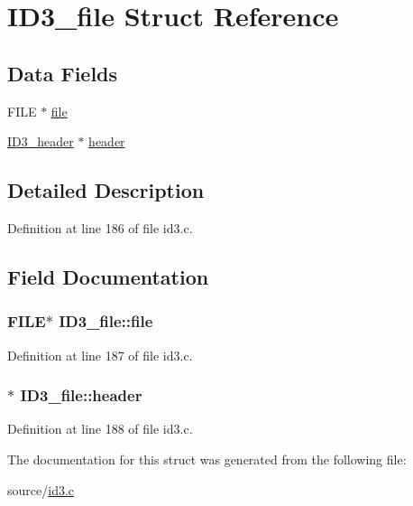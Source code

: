 \hypertarget{structID3__file}{\section{I\-D3\-\_\-file Struct Reference}
\label{structID3__file}
}
\subsection*{Data Fields}
\begin{DoxyCompactItemize}
\item 
F\-I\-L\-E $\ast$ \hyperlink{structID3__file_a2ec35d9c70f5368c51fe6cf5e4ebae28}{file}
\item 
\hyperlink{structID3__header}{I\-D3\-\_\-header} $\ast$ \hyperlink{structID3__file_aeb643841c44545e18ee09451da2bf83d}{header}
\end{DoxyCompactItemize}


\subsection{Detailed Description}


Definition at line 186 of file id3.\-c.



\subsection{Field Documentation}
\hypertarget{structID3__file_a2ec35d9c70f5368c51fe6cf5e4ebae28}{
\subsubsection[{file}]{\setlength{\rightskip}{0pt plus 5cm}F\-I\-L\-E$\ast$ I\-D3\-\_\-file\-::file}}\label{structID3__file_a2ec35d9c70f5368c51fe6cf5e4ebae28}


Definition at line 187 of file id3.\-c.

\hypertarget{structID3__file_aeb643841c44545e18ee09451da2bf83d}{
\subsubsection[{header}]{$\ast$ I\-D3\-\_\-file\-::header}}\label{structID3__file_aeb643841c44545e18ee09451da2bf83d}


Definition at line 188 of file id3.\-c.



The documentation for this struct was generated from the following file\-:\begin{DoxyCompactItemize}
\item 
source/\hyperlink{id3_8c}{id3.\-c}\end{DoxyCompactItemize}
